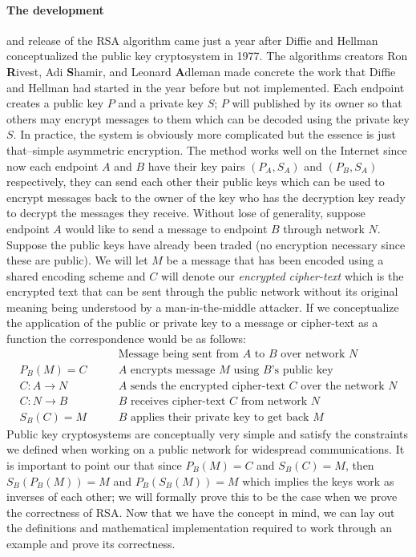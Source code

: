 \documentclass[12pt]{article}
\begin{document}
\paragraph{The development} and release of the RSA algorithm came just a year after Diffie and Hellman conceptualized the public key cryptosystem in 1977.  The algorithms creators Ron \textbf{R}ivest, Adi \textbf{S}hamir, and Leonard \textbf{A}dleman made concrete the work that Diffie and Hellman had started in the year before but not implemented.  Each endpoint creates a public key $P$ and a private key $S$; $P$ will published by its owner so that others may encrypt messages to them which can be decoded using the private key $S$.  In practice, the system is obviously more complicated but the essence is just that--simple asymmetric encryption.  The method works well on the Internet since now each endpoint $A$ and $B$ have their key pairs $(P_A,S_A)$ and $(P_B, S_A)$ respectively, they can send each other their public keys which can be used to encrypt messages back to the owner of the key who has the decryption key ready to decrypt the messages they receive.  Without lose of generality, suppose endpoint $A$ would like to send a message to endpoint $B$ through network $N$.  Suppose the public keys have already been traded (no encryption necessary since these are public).  We will let $M$ be a message that has been encoded using a shared encoding scheme and $C$ will denote our \textit{encrypted cipher-text} which is the encrypted text that can be sent through the public network without its original meaning being understood by a man-in-the-middle attacker.  If we conceptualize the application of the public or private key to a message or cipher-text as a function the correspondence would be as follows:
\begin{align*}
&\qquad\text{Message being sent from $A$ to $B$ over network $N$}\\
P_B(M)=C	&\qquad\text{$A$ encrypts message $M$ using $B$'s public key}\\
C: A\rightarrow N	&\qquad\text{$A$ sends the encrypted cipher-text $C$ over the network $N$}\\
C: N\rightarrow B	&\qquad\text{$B$ receives cipher-text $C$ from network $N$}\\
S_B(C)=M	&\qquad\text{$B$ applies their private key to get back $M$} 
\end{align*}
Public key cryptosystems are conceptually very simple and satisfy the constraints we defined when working on a public network for widespread communications.  It is important to point our that since $P_B(M)=C$ and $S_B(C)=M$, then $S_B(P_B(M))=M$ and $P_B(S_B(M))=M$ which implies the keys work as inverses of each other; we will formally prove this to be the case when we prove the correctness of RSA.  Now that we have the concept in mind, we can lay out the definitions and mathematical implementation required to work through an example and prove its correctness.
\end{document}
